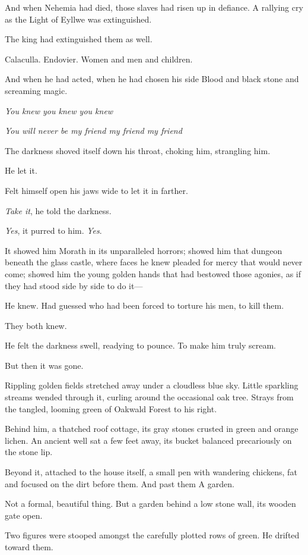 And when Nehemia had died, those slaves had risen up in defiance. A rallying cry as the Light of Eyllwe was extinguished.

The king had extinguished them as well.

Calaculla. Endovier. Women and men and children.

And when he had acted, when he had chosen his side  Blood and black stone and screaming magic.

\emph{You knew you knew you knew}

\emph{You will never be my friend my friend my friend}

The darkness shoved itself down his throat, choking him, strangling him.

He let it.

Felt himself open his jaws wide to let it in farther.

\emph{Take it}, he told the darkness.

\emph{Yes}, it purred to him. \emph{Yes}.

It showed him Morath in its unparalleled horrors; showed him that dungeon beneath the glass castle, where faces he knew pleaded for mercy that would never come; showed him the young golden hands that had bestowed those agonies, as if they had stood side by side to do it---

He knew. Had guessed who had been forced to torture his men, to kill them.

They both knew.

He felt the darkness swell, readying to pounce. To make him truly scream.

But then it was gone.

Rippling golden fields stretched away under a cloudless blue sky. Little sparkling streams wended through it, curling around the occasional oak tree. Strays from the tangled, looming green of Oakwald Forest to his right.

Behind him, a thatched roof cottage, its gray stones crusted in green and orange lichen. An ancient well sat a few feet away, its bucket balanced precariously on the stone lip.

Beyond it, attached to the house itself, a small pen with wandering chickens, fat and focused on the dirt before them. And past them
 A garden.

Not a formal, beautiful thing. But a garden behind a low stone wall, its wooden gate open.

Two figures were stooped amongst the carefully plotted rows of green. He drifted toward them.

